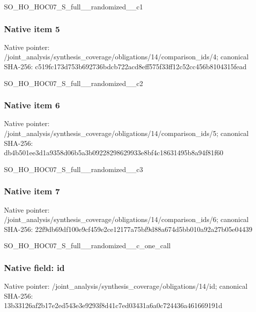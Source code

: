 \documentclass[10pt,a4paper]{article}
\begin{document}
\begingroup\raggedright\sloppy SO\_\allowbreak{}HO\_\allowbreak{}HOC07\_\allowbreak{}S\_\allowbreak{}full\_\allowbreak{}\_\allowbreak{}randomized\_\allowbreak{}\_\allowbreak{}c1\par\endgroup

\subsubsection{Native item 5}
Native pointer: /joint\_\allowbreak{}analysis/synthesis\_\allowbreak{}coverage/obligations/14/comparison\_\allowbreak{}ids/4; canonical SHA-256: c519fc173d753b692736bdcb722acd8eff575f33ff12c52cc456b8104315fead

\begingroup\raggedright\sloppy SO\_\allowbreak{}HO\_\allowbreak{}HOC07\_\allowbreak{}S\_\allowbreak{}full\_\allowbreak{}\_\allowbreak{}randomized\_\allowbreak{}\_\allowbreak{}c2\par\endgroup

\subsubsection{Native item 6}
Native pointer: /joint\_\allowbreak{}analysis/synthesis\_\allowbreak{}coverage/obligations/14/comparison\_\allowbreak{}ids/5; canonical SHA-256: db4b501ee3d1a9358d06b5a3b09228298629933e8bf4c18631495b8a94f81f60

\begingroup\raggedright\sloppy SO\_\allowbreak{}HO\_\allowbreak{}HOC07\_\allowbreak{}S\_\allowbreak{}full\_\allowbreak{}\_\allowbreak{}randomized\_\allowbreak{}\_\allowbreak{}c3\par\endgroup

\subsubsection{Native item 7}
Native pointer: /joint\_\allowbreak{}analysis/synthesis\_\allowbreak{}coverage/obligations/14/comparison\_\allowbreak{}ids/6; canonical SHA-256: 22f9db69df100e9cf459e2ce12177a75bf9d88a674d5bb010a92a27b05e04439

\begingroup\raggedright\sloppy SO\_\allowbreak{}HO\_\allowbreak{}HOC07\_\allowbreak{}S\_\allowbreak{}full\_\allowbreak{}\_\allowbreak{}randomized\_\allowbreak{}\_\allowbreak{}c\_\allowbreak{}one\_\allowbreak{}call\par\endgroup

\subsubsection{Native field: id}
Native pointer: /joint\_\allowbreak{}analysis/synthesis\_\allowbreak{}coverage/obligations/14/id; canonical SHA-256: 13b33126af2b17e2ed543e3e9293f8d41c7ed03431a6a0c724436a461669191d
\end{document}
